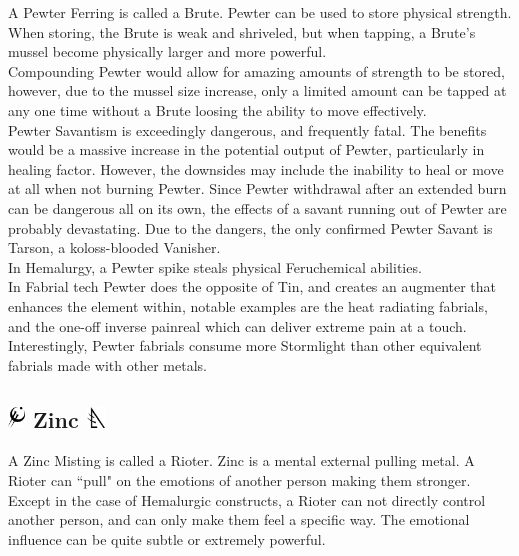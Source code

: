 \documentclass[conference]{IEEEtran}
\begin{document}
A Pewter Ferring is called a Brute.  Pewter can be used to store physical strength.  When storing, the Brute is weak and shriveled, but when tapping, a Brute's mussel become physically larger and more powerful. \\

Compounding Pewter would allow for amazing amounts of strength to be stored, however, due to the mussel size increase, only a limited amount can be tapped at any one time without a Brute loosing the ability to move effectively.\\

Pewter Savantism is exceedingly dangerous, and frequently fatal.  The benefits would be a massive increase in the potential output of Pewter, particularly in healing factor.  However, the downsides may include the inability to heal or move at all when not burning Pewter.  Since Pewter withdrawal after an extended burn can be dangerous all on its own, the effects of a savant running out of Pewter are probably devastating.  Due to the dangers, the only confirmed Pewter Savant is Tarson, a koloss-blooded Vanisher.\\

In Hemalurgy, a Pewter spike steals physical Feruchemical abilities.\\

In Fabrial tech Pewter does the opposite of Tin, and creates an augmenter that enhances the element within, notable examples are the heat radiating fabrials, and the one-off inverse painreal which can deliver extreme pain at a touch.  Interestingly, Pewter fabrials consume more Stormlight than other equivalent fabrials made with other metals.

\subsection*{\includegraphics[height=1em]{images/Zinc.png}  Zinc \includegraphics[height=1em]{images/Zinc_(Feruchemy).png}}
A Zinc Misting is called a Rioter.  Zinc is a mental external pulling metal.  A Rioter can ``pull" on the emotions of another person making them stronger.  Except in the case of Hemalurgic constructs, a Rioter can not directly control another person, and can only make them feel a specific way.  The emotional influence can be quite subtle or extremely powerful.
\end{document}
